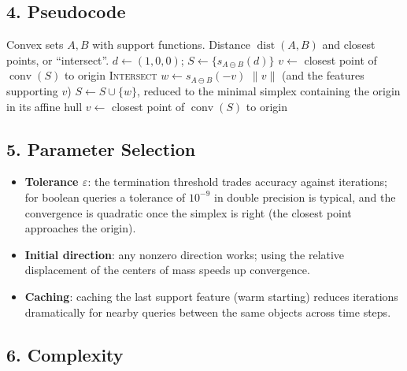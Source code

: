 \subsection{4. Pseudocode}

\begin{algorithm}[htbp]
\caption{GJK Distance / Intersection Test}
\label{alg:convexint_gjk}
\begin{algorithmic}[1]
\Require Convex sets $A, B$ with support functions.
\Ensure Distance $\operatorname{dist}(A,B)$ and closest points, or ``intersect''.
  \State $d \gets (1,0,0)$; $S \gets \{s_{A\ominus B}(d)\}$
  \State $v \gets$ closest point of $\operatorname{conv}(S)$ to origin
     \State \Return \textsc{Intersect} \EndIf
    \State $w \gets s_{A\ominus B}(-v)$
      \State \Return $\|v\|$ (and the features supporting $v$)
    \EndIf
    \State $S \gets S \cup \{w\}$, reduced to the minimal simplex containing the origin in its affine hull
    \State $v \gets$ closest point of $\operatorname{conv}(S)$ to origin
  \EndWhile
\EndFunction
\end{algorithmic}
\end{algorithm}

\subsection{5. Parameter Selection}

\begin{itemize}
\item \textbf{Tolerance $\varepsilon$}: the termination threshold trades
  accuracy against iterations; for boolean queries a tolerance of $10^{-9}$
  in double precision is typical, and the convergence is quadratic once the
  simplex is right (the closest point approaches the origin).
\item \textbf{Initial direction}: any nonzero direction works; using the
  relative displacement of the centers of mass speeds up convergence.
\item \textbf{Caching}: caching the last support feature (warm starting)
  reduces iterations dramatically for nearby queries between the same
  objects across time steps.
\end{itemize}

\subsection{6. Complexity}

